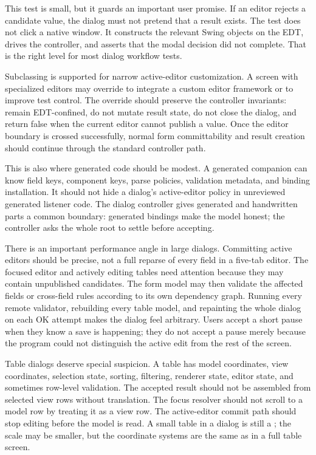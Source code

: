 This test is small, but it guards an important user promise. If an editor
rejects a candidate value, the dialog must not pretend that a result exists.
The test does not click a native window. It constructs the relevant Swing
objects on the EDT, drives the controller, and asserts that the modal decision
did not complete. That is the right level for most dialog workflow tests.

Subclassing  is supported for narrow active-editor
customization. A screen with specialized editors may override
 to integrate a custom editor framework or to improve
test control. The override should preserve the controller invariants: remain
EDT-confined, do not mutate result state, do not close the dialog, and return
false when the current editor cannot publish a value. Once the editor boundary
is crossed successfully, normal form committability and result creation should
continue through the standard controller path.

This is also where generated code should be modest. A generated companion can
know field keys, component keys, parse policies, validation metadata, and
binding installation. It should not hide a dialog's active-editor policy in
unreviewed generated listener code. The dialog controller gives generated and
handwritten parts a common boundary: generated bindings make the model honest;
the controller asks the whole root to settle before accepting.

There is an important performance angle in large dialogs. Committing active
editors should be precise, not a full reparse of every field in a five-tab
editor. The focused editor and actively editing tables need attention because
they may contain unpublished candidates. The form model may then validate the
affected fields or cross-field rules according to its own dependency graph.
Running every remote validator, rebuilding every table model, and repainting
the whole dialog on each OK attempt makes the dialog feel arbitrary. Users
accept a short pause when they know a save is happening; they do not accept a
pause merely because the program could not distinguish the active edit from the
rest of the screen.

Table dialogs deserve special suspicion. A table has model coordinates, view
coordinates, selection state, sorting, filtering, renderer state, editor state,
and sometimes row-level validation. The accepted result should not be assembled
from selected view rows without translation. The focus resolver should not
scroll to a model row by treating it as a view row. The active-editor commit
path should stop editing before the model is read. A small table in a dialog is
still a ; the scale may be smaller, but the coordinate systems are
the same as in a full table screen.

